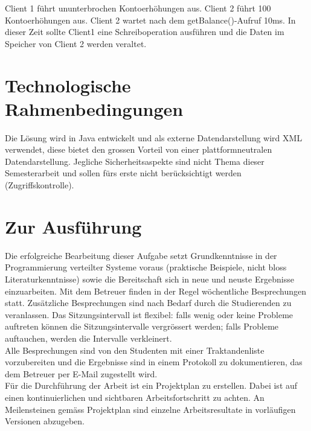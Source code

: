 \documentclass{article}
\begin{document}
Client 1 führt ununterbrochen Kontoerhöhungen aus. Client 2 führt 100 Kontoerhöhungen aus. Client 2 wartet nach dem getBalance()-Aufruf 10ms. In dieser Zeit sollte Client1 eine Schreiboperation ausführen und die Daten im Speicher von Client 2 werden veraltet.


\section{Technologische Rahmenbedingungen}
Die Lösung wird in Java entwickelt und als externe Datendarstellung wird XML verwendet, diese bietet den grossen Vorteil von einer plattformneutralen Datendarstellung. Jegliche Sicherheitsaspekte sind nicht Thema dieser Semesterarbeit und sollen fürs erste nicht berücksichtigt werden (Zugriffskontrolle).

\section{Zur Ausführung}
Die erfolgreiche Bearbeitung dieser Aufgabe setzt Grundkenntnisse in der Programmierung verteilter Systeme voraus (praktische Beispiele, nicht bloss Literaturkenntnisse) sowie die Bereitschaft sich in neue und neuste Ergebnisse einzuarbeiten.
Mit dem Betreuer finden in der Regel wöchentliche Besprechungen statt. Zusätzliche Besprechungen sind nach Bedarf durch die Studierenden zu veranlassen. Das Sitzungsintervall ist flexibel: falls wenig oder keine Probleme auftreten können die Sitzungsintervalle vergrössert werden; falls Probleme auftauchen, werden die Intervalle verkleinert.\\
Alle Besprechungen sind von den Studenten mit einer Traktandenliste vorzubereiten und die Ergebnisse sind in einem Protokoll zu dokumentieren, das dem Betreuer per E-Mail zugestellt wird.\\
Für die Durchführung der Arbeit ist ein Projektplan zu erstellen. Dabei ist auf einen kontinuierlichen und sichtbaren Arbeitsfortschritt zu achten. An Meilensteinen gemäss Projektplan sind einzelne Arbeitsresultate in vorläufigen Versionen abzugeben. 
\end{document}
